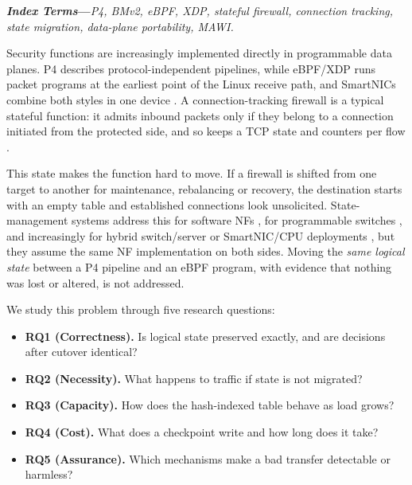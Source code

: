 \documentclass[10pt,twocolumn,letterpaper]{article}
\makeatletter
\renewcommand\section{\@startsection{section}{1}{\z@}{1.4ex plus .3ex minus .2ex}{1ex plus .1ex}{\centering\normalfont\footnotesize\scshape}}
\makeatother
\begin{document}
\begin{center}
\small\textbf{\textit{Index Terms}---}\textit{P4, BMv2, eBPF, XDP, stateful firewall, connection tracking, state migration, data-plane portability, MAWI.}
\end{center}

\section{Introduction}
Security functions are increasingly implemented directly in programmable data planes. P4 \cite{p4} describes protocol-independent pipelines, while eBPF/XDP \cite{xdp} runs packet programs at the earliest point of the Linux receive path, and SmartNICs combine both styles in one device \cite{smartnic}. A connection-tracking firewall is a typical stateful function: it admits inbound packets only if they belong to a connection initiated from the protected side, and so keeps a TCP state and counters per flow \cite{p4sec}.

This state makes the function hard to move. If a firewall is shifted from one target to another for maintenance, rebalancing or recovery, the destination starts with an empty table and established connections look unsolicited. State-management systems address this for software NFs \cite{opennf,splitmerge}, for programmable switches \cite{swing,redplane}, and increasingly for hybrid switch/server or SmartNIC/CPU deployments \cite{switchnic,cora}, but they assume the same NF implementation on both sides. Moving the \emph{same logical state} between a P4 pipeline and an eBPF program, with evidence that nothing was lost or altered, is not addressed.

We study this problem through five research questions:
\begin{itemize}
\item \textbf{RQ1 (Correctness).} Is logical state preserved exactly, and are decisions after cutover identical?
\item \textbf{RQ2 (Necessity).} What happens to traffic if state is not migrated?
\item \textbf{RQ3 (Capacity).} How does the hash-indexed table behave as load grows?
\item \textbf{RQ4 (Cost).} What does a checkpoint write and how long does it take?
\item \textbf{RQ5 (Assurance).} Which mechanisms make a bad transfer detectable or harmless?
\end{itemize}
\end{document}
